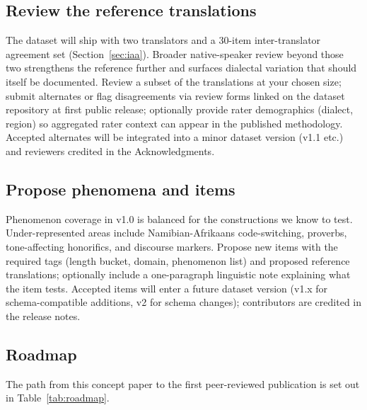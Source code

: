 \documentclass[11pt]{article}
\begin{document}
\subsection{Review the reference translations}

The dataset will ship with two translators and a 30-item
inter-translator agreement set (Section~\ref{sec:iaa}). Broader
native-speaker review beyond those two strengthens the reference
further and surfaces dialectal variation that should itself be
documented. Review a subset of the translations at your chosen
size; submit alternates or flag disagreements via review forms
linked on the dataset repository at first public release;
optionally provide rater demographics (dialect, region) so
aggregated rater context can appear in the published methodology.
Accepted alternates will be integrated into a minor dataset
version (v1.1 etc.) and reviewers credited in the Acknowledgments.

\subsection{Propose phenomena and items}

Phenomenon coverage in v1.0 is balanced for the constructions we
know to test. Under-represented areas include Namibian-Afrikaans
code-switching, proverbs, tone-affecting honorifics, and discourse
markers. Propose new items with the required tags (length bucket,
domain, phenomenon list) and proposed reference translations;
optionally include a one-paragraph linguistic note explaining what
the item tests. Accepted items will enter a future dataset version
(v1.x for schema-compatible additions, v2 for schema changes);
contributors are credited in the release notes.

\subsection{Roadmap}

The path from this concept paper to the first peer-reviewed
publication is set out in Table~\ref{tab:roadmap}.
\end{document}
